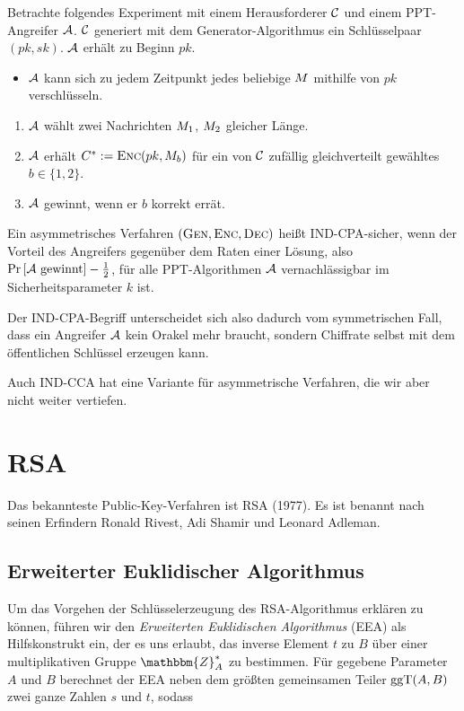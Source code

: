 \begin{definition}\indexINDCPA
  Betrachte folgendes Experiment mit einem Herausforderer $\mathcal{C}$ und einem
  PPT-Angreifer $\mathcal{A}$. $\mathcal{C}$ generiert mit dem Generator-Algorithmus ein
  Schlüsselpaar $(pk, sk)$. $\mathcal{A}$ erhält zu Beginn $pk$.
  \begin{itemize}
  \item $\mathcal{A}$ kann sich zu jedem Zeitpunkt jedes beliebige $M$
    mithilfe von $pk$ verschlüsseln.
  \end{itemize}
  \begin{enumerate}
  \item $\mathcal{A}$ wählt zwei Nachrichten $M_1$, $M_2$ gleicher
    Länge.
  \item $\mathcal{A}$ erhält $C^{*} := \textsc{Enc}(pk, M_{b})$ für ein von
    $\mathcal{C}$ zufällig gleichverteilt gewähltes $b \in \{1, 2\}$.
  \item $\mathcal{A}$ gewinnt, wenn er $b$ korrekt errät.
  \end{enumerate} 
  Ein asymmetrisches Verfahren $(\textsc{Gen}, \textsc{Enc}, \textsc{Dec})$ heißt IND-CPA-sicher, wenn der Vorteil des
  Angreifers gegenüber dem Raten einer Lösung, also $\Pr \left[ \mathcal{A}
    \textnormal{ gewinnt} \right] - \frac{1}{2}$, für alle
  PPT-Algorithmen $\mathcal{A}$ vernachlässigbar im Sicherheitsparameter $k$ ist.
\end{definition}

Der IND-CPA-Begriff unterscheidet sich also dadurch vom symmetrischen
Fall, dass ein Angreifer $\mathcal{A}$ kein Orakel mehr braucht, sondern
Chiffrate selbst mit dem öffentlichen Schlüssel erzeugen kann.

Auch IND-CCA hat eine Variante für asymmetrische Verfahren, die wir aber
nicht weiter vertiefen.

\section{RSA}
Das bekannteste Public-Key-Verfahren ist RSA \indexRSATextBook (1977). Es ist benannt nach seinen
Erfindern Ronald Rivest, Adi Shamir und Leonard Adleman.

\subsection{Erweiterter Euklidischer Algorithmus}
\label{ssec:eea}
Um das Vorgehen der Schlüsselerzeugung des RSA-Algorithmus erklären zu
können, führen wir den \emph{Erweiterten Euklidischen Algorithmus} (EEA) \indexEEA 
als Hilfskonstrukt ein, der es uns erlaubt, das inverse Element $t$ zu
$B$ über einer multiplikativen Gruppe $\mathbbm{Z}^{\ast}_{A}$ zu
bestimmen. Für gegebene Parameter $A$ und $B$ berechnet der EEA neben
dem größten gemeinsamen Teiler $\operatorname{ggT}(A, B)$ zwei ganze Zahlen $s$ und $t$, sodass 

